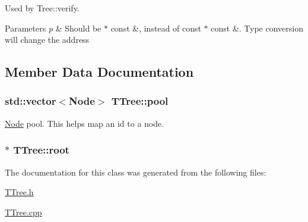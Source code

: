 Used by Tree\+::verify. 


\begin{DoxyParams}{Parameters}
{\em p} & Should be $\ast$ const \&, instead of const $\ast$ const \&. Type conversion will change the address \\
\hline
\end{DoxyParams}


\subsection{Member Data Documentation}
\hypertarget{classTTree_a58f7a793347834e9caee3d87c7202966}{}
\subsubsection[{pool}]{\setlength{\rightskip}{0pt plus 5cm}std\+::vector$<${\bf Node}$>$ T\+Tree\+::pool\hspace{0.3cm}{\ttfamily [private]}}\label{classTTree_a58f7a793347834e9caee3d87c7202966}


\hyperlink{classTTree_1_1Node}{Node} pool. This helps map an id to a node. 

\hypertarget{classTTree_a76972bd24a6d2f940fe1645d008a4a04}{}
\subsubsection[{root}]{$\ast$ T\+Tree\+::root\hspace{0.3cm}{\ttfamily [private]}}\label{classTTree_a76972bd24a6d2f940fe1645d008a4a04}


The documentation for this class was generated from the following files\+:\begin{DoxyCompactItemize}
\item 
\hyperlink{TTree_8h}{T\+Tree.\+h}\item 
\hyperlink{TTree_8cpp}{T\+Tree.\+cpp}\end{DoxyCompactItemize}
